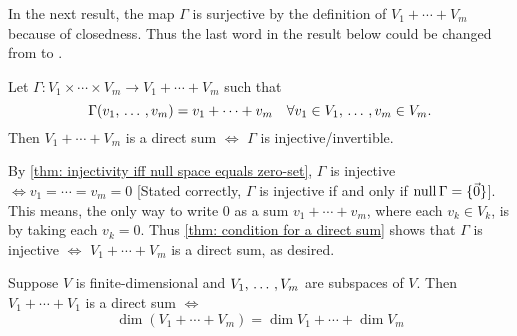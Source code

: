 In the next result, the map $\Gamma$ is surjective by the definition of $V_1 + \cdots + V_m$ because of closedness. Thus the last word in the result below could be changed from  to .

\begin{thm}
  \label{thm: products and direct sums}
  Let $\Gamma: V_1 \times \cdots \times V_m \to V_1 + \cdots + V_m$ such that
  \begin{equation}
    \Gamma(v_1, {\, \ldots \,\,}, v_m) = v_1 + \cdots + v_m \quad \forall v_1 \in V_1, {\, \ldots \,\,}, v_m \in V_m.
  \end{equation}
  Then $V_1 + \cdots + V_m$ is a direct sum $\iff$ $\Gamma$ is injective/invertible.
\end{thm}
\begin{prf}
  By \ref{thm: injectivity iff null space equals zero-set}, $\Gamma$ is injective $\iff v_1 = \cdots = v_m = 0$ [Stated correctly, $\Gamma$ is injective if and only if $\operatorname{null} \Gamma = \{ \vec 0 \}$]. This means, the only way to write $0$ as a sum $v_1 + \cdots + v_m$, where each $v_k \in V_k$, is by taking each $v_k=0$. Thus \ref{thm: condition for a direct sum} shows that $\Gamma$ is injective $\iff$ $V_1 + \cdots + V_m$ is a direct sum, as desired.
\end{prf}

\begin{thm}
  \label{thm: a sum is a direct sum if and only if the dimensions add up}
  Suppose $V$ is finite-dimensional and $V_1, {\, \ldots \,\,},V_m$ are subspaces of $V$. Then $V_1 + \cdots + V_1$ is a direct sum $\iff$
  \begin{equation}
    \dim (V_1+\cdots+V_m) = \dim V_1 + \cdots + \dim V_m
  \end{equation}
\end{thm}

